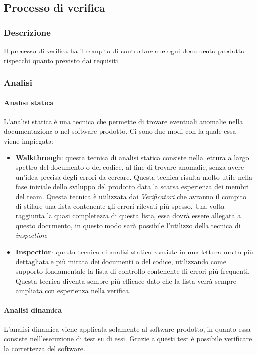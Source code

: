 \subsection{Processo di verifica}
\subsubsection{Descrizione}
Il processo di verifica ha il compito di controllare che ogni documento prodotto 
rispecchi quanto previsto dai requisiti.
\subsubsection{Analisi}
\paragraph{Analisi statica}
L'analisi statica è una tecnica che permette di trovare eventuali anomalie nella 
documentazione o nel software prodotto. Ci sono due modi con la quale essa viene 
impiegata:
\begin{itemize}
  \item \textbf{Walkthrough}: questa tecnica di analisi statica consiste nella 
  lettura a largo spettro del documento o del codice, al fine di trovare anomalie, 
  senza avere un'idea precisa degli errori da cercare. Questa tecnica risulta 
  molto utile nella fase iniziale dello sviluppo del prodotto data la scarsa 
  esperienza dei membri del team. Questa tecnica è utilizzata dai \textit{Verificatori} 
  che avranno il compito di stilare una lista contenente gli errori rilevati più 
  spesso. Una volta raggiunta la quasi completezza di questa lista, essa dovrà 
  essere allegata a questo documento, in questo modo sarà possibile l'utilizzo 
  della tecnica di \textit{inspection};
  \item \textbf{Inspection}: questa tecnica di analisi statica consiste in una 
  lettura molto più dettagliata e più mirata dei documenti o del codice, 
  utilizzando come supporto fondamentale la lista di controllo contenente fli 
  errori più frequenti. Questa tecnica diventa sempre più efficace dato che la 
  lista verrà sempre ampliata con esperienza nella verifica.
\end{itemize}
\paragraph{Analisi dinamica}
L'analisi dinamica viene applicata solamente al software prodotto, in quanto 
essa consiste nell'esecuzione di test su di essi. Grazie a questi test è 
possibile verificare la correttezza del software.
